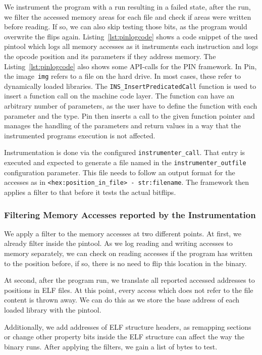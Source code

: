 We instrument the program with a run resulting in a failed state, after the run,
we filter the accessed memory areas for each file and check if areas were
written before reading. If so, we can also skip testing those bits, as the
program would overwrite the flips again. Listing~\ref{lst:pinlogcode} shows a
code snippet of the used pintool which logs all memory accesses as it
instruments each instruction and logs the opcode position and its parameters if
they address memory. The Listing~\ref{lst:pinlogcode} also shows some API-calls
for the PIN framework. In Pin, the image~\texttt{img} refers to a file on the
hard drive. In most cases, these refer to dynamically loaded libraries. The
\texttt{INS\_InsertPredicatedCall} function is used to insert a function call on
the machine code layer. The function can have an arbitrary number of parameters,
as the user have to define the function with each parameter and the type. Pin
then inserts a call to the given function pointer and manages the handling of
the parameters and return values in a way that the instrumented
program\textquotesingle s execution is not affected.

Instrumentation is done via the configured \texttt{instrumenter\_call}. That
entry is executed and expected to generate a file named in the
\texttt{instrumenter\_outfile} configuration parameter. This file needs to
follow an output format for the accesses as in \texttt{<hex:position\_in\_file>
- str:filename}. The framework then applies a filter to that before it tests the
actual bitflips.

\subsubsection{Filtering Memory Accesses reported by the Instrumentation}

We apply a filter to the memory accesses at two different points. At first, we
already filter inside the pintool. As we log reading and writing accesses to
memory separately, we can check on reading accesses if the program
has written to the position before, if so, there is no need to flip this
location in the binary.

At second, after the program run, we translate all reported accessed addresses
to positions in ELF files. At this point, every access which does not refer to
the file content is thrown away. We can do this as we store the base address of
each loaded library with the pintool.

Additionally, we add addresses of ELF structure headers, as remapping sections
or change other property bits inside the ELF structure can affect the way the
binary runs. After applying the filters, we gain a list of bytes to test.

